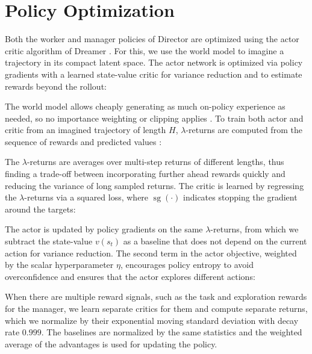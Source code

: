 \section{Policy Optimization}
\label{sec:policyopt}

Both the worker and manager policies of Director are optimized using the actor critic algorithm of Dreamer \citep{hafner2019dreamer,hafner2020dreamerv2}. 
For this, we use the world model to imagine a trajectory in its compact latent space. 
The actor network is optimized via policy gradients \citep{williams1992reinforce} with a learned state-value critic for variance reduction and to estimate rewards beyond the rollout:


The world model allows cheaply generating as much on-policy experience as needed, so no importance weighting or clipping applies \citep{schulman2017ppo}. 
To train both actor and critic from an imagined trajectory of length $H$, $\lambda$-returns are computed from the sequence of rewards and predicted values \citep{sutton2018rlbook}:


The $\lambda$-returns are averages over multi-step returns of different lengths, thus finding a trade-off between incorporating further ahead rewards quickly and reducing the variance of long sampled returns. 
The critic is learned by regressing the $\lambda$-returns via a squared loss, where $\operatorname{sg}(\cdot)$ indicates stopping the gradient around the targets:


The actor is updated by policy gradients on the same $\lambda$-returns, from which we subtract the state-value $v(s_t)$ as a baseline that does not depend on the current action for variance reduction. 
The second term in the actor objective, weighted by the scalar hyperparameter $\eta$, encourages policy entropy to avoid overconfidence and ensures that the actor explores different actions:


When there are multiple reward signals, such as the task and exploration rewards for the manager, we learn separate critics \citep{burda2018rnd} for them and compute separate returns, which we normalize by their exponential moving standard deviation with decay rate $0.999$. 
The baselines are normalized by the same statistics and the weighted average of the advantages is used for updating the policy.
